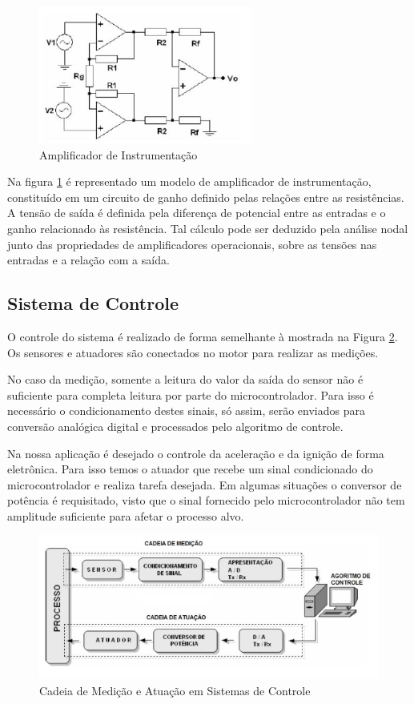 \begin{figure}[h!]
	\centering
	\includegraphics[keepaspectratio=true,scale= 0.7]{figuras/Amplificador.PNG}
	\caption{Amplificador de Instrumentação \cite{SMAR}}
	\label{amplificadorDeInstrumentacao}
\end{figure}

Na figura \ref{amplificadorDeInstrumentacao} é representado um modelo de amplificador de instrumentação, constituído em um circuito de ganho definido pelas relações entre as resistências. A tensão de saída é definida pela diferença de potencial entre as entradas e o ganho relacionado às resistência. Tal cálculo pode ser deduzido pela análise nodal junto das propriedades de amplificadores operacionais, sobre as tensões nas entradas e a relação com a saída.

\subsection{Sistema de Controle}

O controle do sistema é realizado de forma semelhante à mostrada na Figura \ref{CadeiaDeMedicao}. Os sensores e atuadores são conectados no motor para realizar as medições. 

No caso da medição, somente a leitura do valor da saída do sensor não é suficiente para completa leitura por parte do microcontrolador. Para isso é necessário o condicionamento destes sinais, só assim, serão enviados para conversão analógica digital e processados pelo algoritmo de controle.

Na nossa aplicação é desejado o controle da aceleração e da ignição de forma eletrônica. Para isso temos o atuador que recebe um sinal condicionado do microcontrolador e realiza tarefa desejada. Em algumas situações o conversor de potência é requisitado, visto que o sinal fornecido pelo microcontrolador não tem amplitude suficiente para afetar o processo alvo.

\begin{figure}[h!]
	\centering
	\includegraphics[keepaspectratio=true,scale= 0.9]{figuras/CadeiaDeMedicao.PNG}
	\caption{Cadeia de Medição e Atuação em Sistemas de Controle \cite{SMAR}}
	\label{CadeiaDeMedicao}
\end{figure}


